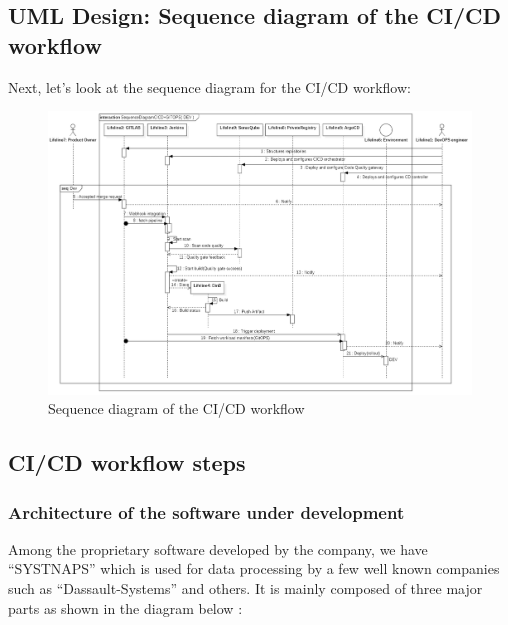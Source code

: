 \subsection{UML Design: Sequence diagram of the CI/CD workflow }

Next, let’s look at the sequence diagram for the CI/CD workflow: 
\begin{figure}[H]\centering
\includegraphics[width=1.0\textwidth,angle=00]{assets/f46.png}
\caption{ Sequence diagram of the CI/CD workflow}
\label{fig:sequence diagram of the CI/CD workflow}
\end{figure}

\subsection{CI/CD workflow steps }

\subsubsection{Architecture of the software under development }

Among the proprietary software developed by the company, we have “SYSTNAPS” which is used for data processing by a few well known companies such as “Dassault-Systems” and others. It is mainly composed of three major parts as shown in the diagram below : 

